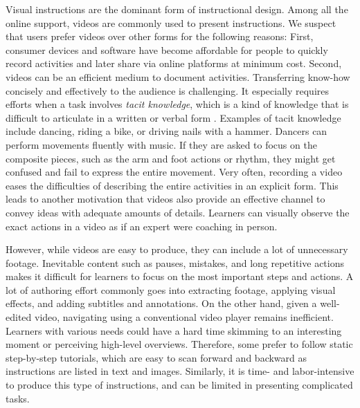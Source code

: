 Visual instructions are the dominant form of instructional design.
%
Among all the online support, videos are commonly used to present instructions. We suspect that users prefer videos over other forms for the following reasons:
%
First, consumer devices and software have become affordable for people to quickly record activities and later share via online platforms at minimum cost.
%
Second, videos can be an efficient medium to document activities. Transferring know-how concisely and effectively to the audience is challenging. It especially requires efforts when a task involves \emph{tacit knowledge}, which is a kind of knowledge that is difficult to articulate in a written or verbal form \cite{polanyi1958personal, Klemmer:2006:BMF:1142405.1142429}. Examples of tacit knowledge include dancing, riding a bike, or driving nails with a hammer. Dancers can perform movements fluently with music. If they are asked to focus on the composite pieces, such as the arm and foot actions or rhythm, they might get confused and fail to express the entire movement. Very often, recording a video eases the difficulties of describing the entire activities in an explicit form.
%
This leads to another motivation that videos also provide an effective channel to convey ideas with adequate amounts of details. Learners can visually observe the exact actions in a video as if an expert were coaching in person.

However, while videos are easy to produce, they can include a lot of unnecessary footage. Inevitable content such as pauses, mistakes, and long repetitive actions makes it difficult for learners to focus on the most important steps and actions. A lot of authoring effort commonly goes into extracting footage, applying visual effects, and adding subtitles and annotations. On the other hand, given a well-edited video, navigating using a conventional video player remains inefficient. Learners with various needs could have a hard time skimming to an interesting moment or perceiving high-level overviews. Therefore, some prefer to follow static step-by-step tutorials, which are easy to scan forward and backward as instructions are listed in text and images. Similarly, it is time- and labor-intensive to produce this type of instructions, and can be limited in presenting complicated tasks.

